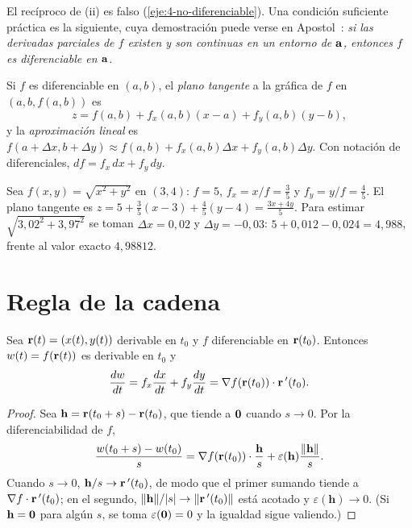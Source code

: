 El recíproco de (ii) es falso (\cref{eje:4-no-diferenciable}). Una condición suficiente práctica es la siguiente, cuya demostración puede verse en Apostol~\cite[cap.~8]{apostol2}: \emph{si las derivadas parciales de $f$ existen y son continuas en un entorno de $\mathbf{a}$, entonces $f$ es diferenciable en $\mathbf{a}$.}

\begin{definicion}\label{def:tangente}
Si $f$ es diferenciable en $(a,b)$, el \emph{plano tangente} a la gráfica de $f$ en $(a,b,f(a,b))$ es
\[
z=f(a,b)+f_x(a,b)(x-a)+f_y(a,b)(y-b),
\]
y la \emph{aproximación lineal} es $f(a+\Delta x,b+\Delta y)\approx f(a,b)+f_x(a,b)\Delta x+f_y(a,b)\Delta y$. Con notación de diferenciales, $df=f_x\,dx+f_y\,dy$.
\end{definicion}

\begin{ejemplo}\label{ej:t4-aproximacion}
Sea $f(x,y)=\sqrt{x^2+y^2}$ en $(3,4)$: $f=5$, $f_x=x/f=\tfrac35$ y $f_y=y/f=\tfrac45$. El plano tangente es $z=5+\tfrac35(x-3)+\tfrac45(y-4)=\tfrac{3x+4y}{5}$. Para estimar $\sqrt{3{,}02^2+3{,}97^2}$ se toman $\Delta x=0{,}02$ y $\Delta y=-0{,}03$: $5+0{,}012-0{,}024=4{,}988$, frente al valor exacto $4{,}98812$.
\end{ejemplo}

\section{Regla de la cadena}

\begin{teorema}\label{teo:cadena}
Sea $\mathbf{r}(t)=(x(t),y(t))$ derivable en $t_0$ y $f$ diferenciable en $\mathbf{r}(t_0)$. Entonces $w(t)=f(\mathbf{r}(t))$ es derivable en $t_0$ y
\[
\frac{dw}{dt}=f_x\frac{dx}{dt}+f_y\frac{dy}{dt}=\nabla f(\mathbf{r}(t_0))\cdot\mathbf{r}\,'(t_0).
\]
\end{teorema}

\begin{proof}
Sea $\mathbf h=\mathbf{r}(t_0+s)-\mathbf{r}(t_0)$, que tiende a $\mathbf{0}$ cuando $s\to0$. Por la diferenciabilidad de $f$,
\[
\frac{w(t_0+s)-w(t_0)}{s}=\nabla f(\mathbf{r}(t_0))\cdot\frac{\mathbf h}{s}+\varepsilon(\mathbf h)\frac{\lVert\mathbf h\rVert}{s}.
\]
Cuando $s\to0$, $\mathbf h/s\to\mathbf{r}\,'(t_0)$, de modo que el primer sumando tiende a $\nabla f\cdot\mathbf{r}\,'(t_0)$; en el segundo, $\lVert\mathbf h\rVert/\lvert s\rvert\to\lVert\mathbf{r}\,'(t_0)\rVert$ está acotado y $\varepsilon(\mathbf h)\to0$. (Si $\mathbf h=\mathbf{0}$ para algún $s$, se toma $\varepsilon(\mathbf{0})=0$ y la igualdad sigue valiendo.)
\end{proof}

